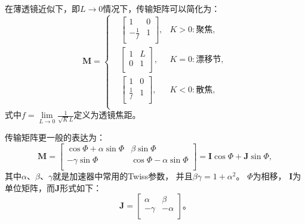 在薄透镜近似下，即$L \rightarrow 0$情况下，传输矩阵可以简化为：
\begin{equation}
    \label{eq:Mathier_Hill_tranfermap_thinlen}
    \mathbf{M}=\left\{
    \begin{aligned}
        &\begin{bmatrix}
          1              & 0  \\
         - \frac{1}{f}   & 1  \\
        \end{bmatrix}
        ,& K>0:\text{聚焦},  \\
        &\begin{bmatrix}
          1 & L  \\
          0 & 1  \\
        \end{bmatrix}
        ,& K=0:\text{漂移节}, \\
        &\begin{bmatrix}
          1              & 0  \\
          \frac{1}{f}    & 1   \\
        \end{bmatrix}
        ,& K<0:\text{散焦}, \\
    \end{aligned}
    \right.
\end{equation}
式中$f = \lim \limits_{L \rightarrow 0} \frac{1}{\sqrt{K}L}$定义为透镜焦距。

传输矩阵更一般的表达为：
\begin{equation}
    \label{eq:Mathier_Hill_tranfermap2}
    \mathbf{M}=
    \begin{bmatrix}
      \cos \Phi + \alpha \sin \Phi    & \beta \sin \Phi  \\
      -\gamma \sin \Phi  & \cos \Phi - \alpha \sin \Phi  \\
    \end{bmatrix}
    =
    \textbf{I} \cos \Phi + \textbf{J} \sin \Phi ,
\end{equation}
其中$\alpha$、$\beta$、$\gamma$就是加速器中常用的Twiss参数，
并且$\beta \gamma = 1+{\alpha}^2$。
$\Phi$为相移，
$\textbf{I}$为单位矩阵，而$\textbf{J}$形式如下：
\begin{equation}
    \label{eq:Mathier_Hill_tranfermap3}
    \textbf{J}=
    \begin{bmatrix}
      \alpha    & \beta  \\
      -\gamma   & -\alpha \\
    \end{bmatrix} \text{。}
\end{equation}


